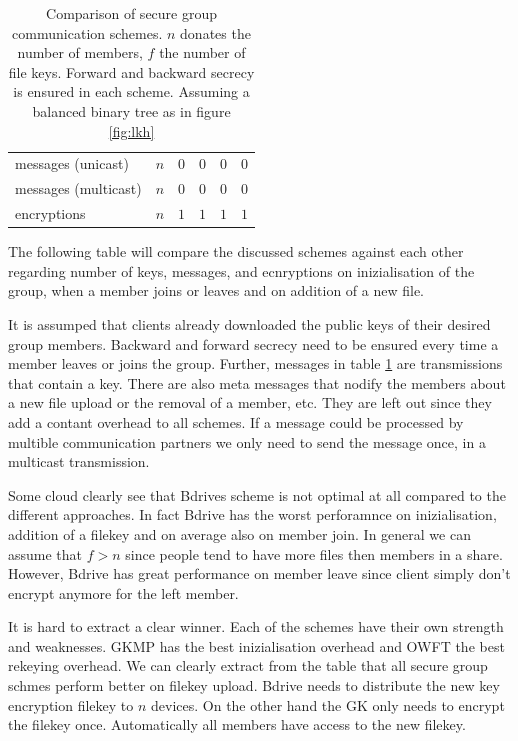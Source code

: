 \begin{table}[!ht]
\begin{tabular}{l 		| l 						| l 							| l 						| l 						| l }
messages (unicast)		& $n$		 				& $0$	 						& $0$ 						& $0$		 				& $0$			\\
messages (multicast)	& $n$ 						& $0$ 							& $0$ 						& $0$	 					& $0$			\\
encryptions				& $n$ 						& $1$ 							& $1$ 						& $1$		 				& $1$			\\
\hline
\end{tabular}
\caption{Comparison of secure group communication schemes. $n$ donates the number of members, $f$ the number of file keys. Forward and backward secrecy is ensured in each scheme. Assuming a balanced binary tree as in figure \ref{fig:lkh}}
\label{tab:comparisons}
\end{table}

The following table will compare the discussed schemes against each other regarding number of keys, messages, and ecnryptions on inizialisation of the group, when a member joins or leaves and on addition of a new file. 

It is assumped that clients already downloaded the public keys of their desired group members. Backward and forward secrecy need to be ensured every time a member leaves or joins the group.
Further, messages in table \ref{tab:comparisons} are transmissions that contain a key. There are also meta messages that nodify the members about a new file upload or the removal of a member, etc. They are left out since they add a contant overhead to all schemes.  If a message could be processed by multible communication partners we only need to send the message once, in a multicast transmission.

Some cloud clearly see that Bdrives scheme is not optimal at all compared to the different approaches. In fact Bdrive has the worst perforamnce on inizialisation, addition of a filekey and on average also on member join. In general we can assume that $f > n$ since people tend to have more files then members in a share. However, Bdrive has great performance on member leave since client simply don't encrypt anymore for the left member.

It is hard to extract a clear winner. Each of the schemes have their own strength and weaknesses. GKMP has the best inizialisation overhead and OWFT the best rekeying overhead. We can clearly extract from the table that all secure group schmes perform better on filekey upload. Bdrive needs to distribute the new key encryption filekey to $n$ devices. On the other hand the GK only needs to encrypt the filekey once. Automatically all members have access to the new filekey. 

